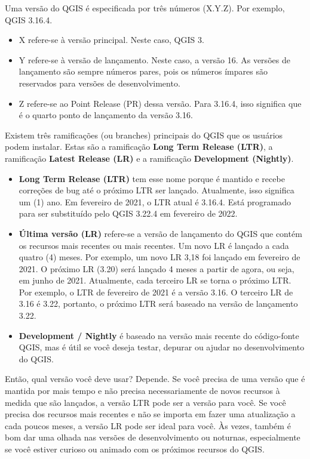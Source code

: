 \documentclass[
  portuguese,
]{krantz}
\providecommand{\tightlist}{%
  \setlength{\itemsep}{0pt}\setlength{\parskip}{0pt}}
\begin{document}
Uma versão do QGIS é especificada por três números (X.Y.Z). Por exemplo, QGIS 3.16.4.

\begin{itemize}
\tightlist
\item
  X refere-se à versão principal. Neste caso, QGIS 3.
\item
  Y refere-se à versão de lançamento. Neste caso, a versão 16. As versões de lançamento são sempre números pares, pois os números ímpares são reservados para versões de desenvolvimento.
\item
  Z refere-se ao Point Release (PR) dessa versão. Para 3.16.4, isso significa que é o quarto ponto de lançamento da versão 3.16.
\end{itemize}

Existem três ramificações (ou branches) principais do QGIS que os usuários podem instalar. Estas são a ramificação \textbf{Long Term Release (LTR)}, a ramificação \textbf{Latest Release (LR)} e a ramificação \textbf{Development (Nightly)}.

\begin{itemize}
\tightlist
\item
  \textbf{Long Term Release (LTR)} tem esse nome porque é mantido e recebe correções de bug até o próximo LTR ser lançado. Atualmente, isso significa um (1) ano. Em fevereiro de 2021, o LTR atual é 3.16.4. Está programado para ser substituído pelo QGIS 3.22.4 em fevereiro de 2022.
\item
  \textbf{Última versão (LR)} refere-se a versão de lançamento do QGIS que contém os recursos mais recentes ou mais recentes. Um novo LR é lançado a cada quatro (4) meses. Por exemplo, um novo LR 3,18 foi lançado em fevereiro de 2021. O próximo LR (3.20) será lançado 4 meses a partir de agora, ou seja, em junho de 2021. Atualmente, cada terceiro LR se torna o próximo LTR. Por exemplo, o LTR de fevereiro de 2021 é a versão 3.16. O terceiro LR de 3.16 é 3.22, portanto, o próximo LTR será baseado na versão de lançamento 3.22.
\item
  \textbf{Development / Nightly} é baseado na versão mais recente do código-fonte QGIS, mas é útil se você deseja testar, depurar ou ajudar no desenvolvimento do QGIS.
\end{itemize}

Então, qual versão você deve usar? Depende. Se você precisa de uma versão que é mantida por mais tempo e não precisa necessariamente de novos recursos à medida que são lançados, a versão LTR pode ser a versão para você. Se você precisa dos recursos mais recentes e não se importa em fazer uma atualização a cada poucos meses, a versão LR pode ser ideal para você. Às vezes, também é bom dar uma olhada nas versões de desenvolvimento ou noturnas, especialmente se você estiver curioso ou animado com os próximos recursos do QGIS.
\end{document}
